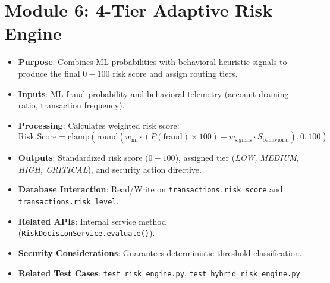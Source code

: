 \section{Module 6: 4-Tier Adaptive Risk Engine}
\begin{itemize}
    \item \textbf{Purpose}: Combines ML probabilities with behavioral heuristic signals to produce the final $0-100$ risk score and assign routing tiers.
    \item \textbf{Inputs}: ML fraud probability and behavioral telemetry (account draining ratio, transaction frequency).
    \item \textbf{Processing}: Calculates weighted risk score:
    \begin{equation}
        \text{Risk Score} = \text{clamp}\left(\text{round}\left(w_{\text{ml}} \cdot (P(\text{fraud}) \times 100) + w_{\text{signals}} \cdot S_{\text{behavioral}}\right), 0, 100\right)
    \end{equation}
    \item \textbf{Outputs}: Standardized risk score ($0-100$), assigned tier (\textit{LOW, MEDIUM, HIGH, CRITICAL}), and security action directive.
    \item \textbf{Database Interaction}: Read/Write on \texttt{transactions.risk\_score} and \texttt{transactions.risk\_level}.
    \item \textbf{Related APIs}: Internal service method (\texttt{RiskDecisionService.evaluate()}).
    \item \textbf{Security Considerations}: Guarantees deterministic threshold classification.
    \item \textbf{Related Test Cases}: \texttt{test\_risk\_engine.py}, \texttt{test\_hybrid\_risk\_engine.py}.
\end{itemize}

